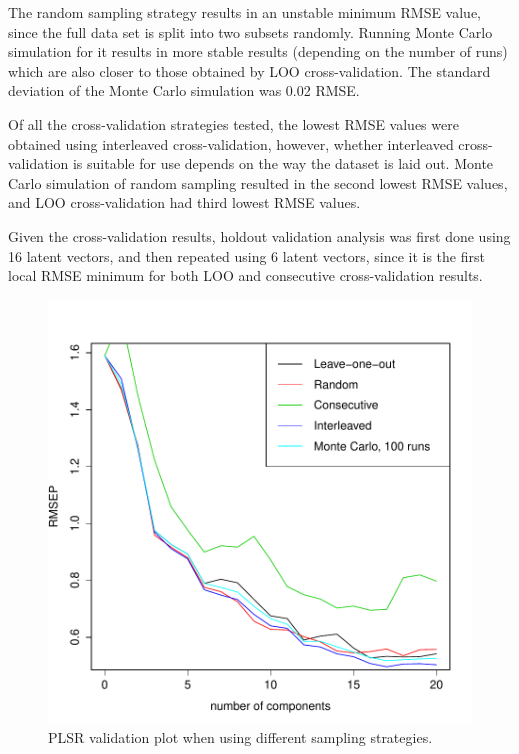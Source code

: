 \documentclass{isprs}
\begin{document}
The random sampling strategy results in an unstable minimum RMSE value, since the full data set is split into two subsets randomly. Running Monte Carlo simulation for it results in more stable results (depending on the number of runs) which are also closer to those obtained by LOO cross-validation. The standard deviation of the Monte Carlo simulation was 0.02 RMSE.

Of all the cross-validation strategies tested, the lowest RMSE values were obtained using interleaved cross-validation, however, whether interleaved cross-validation is suitable for use depends on the way the dataset is laid out. Monte Carlo simulation of random sampling resulted in the second lowest RMSE values, and LOO cross-validation had third lowest RMSE values.

Given the cross-validation results, holdout validation analysis was first done using 16 latent vectors, and then repeated using 6 latent vectors, since it is the first local RMSE minimum for both LOO and consecutive cross-validation results.

\begin{figure}[ht!]
\includegraphics[width=1.0\columnwidth]{../script/output/cv.pdf}
\begin{center}
    \caption{PLSR validation plot when using different sampling strategies.}
    \label{fig:cv}
\end{center}
\end{figure}
\end{document}
